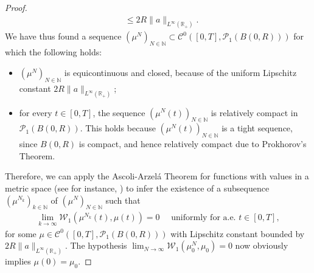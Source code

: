 \documentclass[A4paper,11pt]{article}
\theoremstyle{definition}
\newcommand{\N}{\mathbb{N}}
\newcommand{\R}{\mathbb{R}}
\newcommand{\W}{\mathcal{W}}
\begin{document}
\begin{proof}
\begin{align*}
&\leq 2R\|a\|_{L^{\infty}(\R_+)}.
\end{align*}
We have thus found a sequence $(\mu^N)_{N \in \N} \subset \mathcal{C}^0([0,T],\mathcal{P}_1(B(0,R)))$ for which the following holds:
\begin{itemize}
\item $(\mu^N)_{N \in \N}$ is equicontinuous and closed, because of the uniform Lipschitz constant $2R\|a\|_{L^{\infty}(\R_+)}$;
\item for every $t \in [0,T]$, the sequence $(\mu^N(t))_{N \in \N}$ is relatively compact in $\mathcal{P}_1(B(0,R))$. This holds because $(\mu^N(t))_{N \in \N}$ is a tight sequence, since $B(0,R)$ is compact, and hence relatively compact due to Prokhorov's Theorem.
\end{itemize}
Therefore, we can apply the Ascoli-Arzel\'{a} Theorem for functions with values in a metric space (see for instance, \cite[Chapter 7, Theorem 18]{KelleyTop}) to infer the existence of a subsequence $(\mu^{N_k})_{k \in \N}$ of $(\mu^N)_{N \in \N}$ such that
\begin{align}\label{eq:unifconv}
\lim_{k \rightarrow \infty}\W_1(\mu^{N_k}(t),\mu(t)) = 0 \quad \text{ uniformly for a.e. } t \in [0,T],
\end{align}
for some $\mu \in \mathcal{C}^0([0,T],\mathcal{P}_1(B(0,R)))$ with Lipschitz constant bounded by $2R\|a\|_{L^{\infty}(\R_+)}$. The hypothesis $\lim_{N\rightarrow\infty}\W_1(\mu^N_0,\mu_0) = 0$ now obviously implies $\mu(0) = \mu_0$.


\end{proof}
\end{document}
